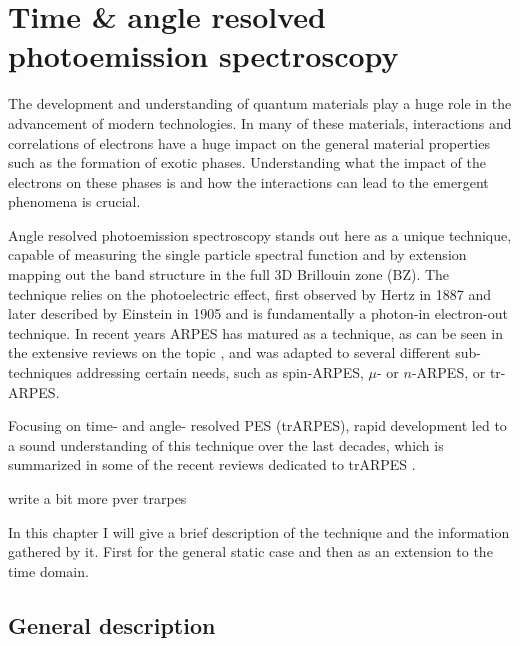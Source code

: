 \chapter{Time \& angle resolved photoemission spectroscopy}

The development and understanding of quantum materials play a huge role in the advancement of modern technologies.
In many of these materials, interactions and correlations of electrons have a huge impact on the general material properties such as the formation of exotic phases.
Understanding what the impact of the electrons on these phases is and how the interactions can lead to the emergent phenomena is crucial.

Angle resolved photoemission spectroscopy stands out here as a unique technique, capable of measuring the single particle spectral function and by extension mapping out the band structure in the full 3D Brillouin zone (BZ).
The technique relies on the photoelectric effect, first observed by Hertz in 1887 and later described by Einstein in 1905 and is fundamentally a photon-in electron-out technique.
In recent years ARPES has matured as a technique, as can be seen in the extensive reviews on the topic \cite{}, and was adapted to several different sub-techniques addressing certain needs, such as spin-ARPES, $\mu$- or $n$-ARPES, or tr-ARPES.

Focusing on time- and angle- resolved PES (trARPES), rapid development led to a sound understanding of this technique over the last decades, which is summarized in some of the recent reviews dedicated to trARPES \cite{}.


write a bit more pver trarpes

In this chapter I will give a brief description of the technique and the information gathered by it.
First for the general static case and then as an extension to the time domain.

\section{General description}

